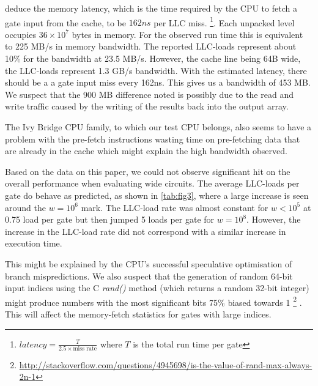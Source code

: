 deduce the memory latency, which is the time required by the CPU to fetch a gate
input from the cache, to be $162ns$ per LLC miss.
\footnote{ $latency = \frac{T}{2.5 \times \text{miss rate}}$ where $T$ is the total run time per gate}.
Each unpacked level occupies $ 36\times10^7$ bytes in memory. For the observed
run time this is equivalent to 225 MB/s in memory bandwidth. The reported LLC-loads
represent about 10\% for the bandwidth at 23.5 MB/s. However, the cache line
being 64B wide, the LLC-loads represent 1.3 GB/s bandwidth. With the estimated
latency, there should be a a gate input miss every 162ns. This gives us a bandwidth
of 453 MB. We suspect that the 900 MB difference noted is possibly due to the
read and write traffic caused by the writing of the results back into the output
array.
\par
The Ivy Bridge CPU family, to which our test CPU belongs, also seems to have a
problem with the pre-fetch instructions wasting time on pre-fetching data that
are already in the cache\cite{agner} which might explain the high bandwidth
observed.
\par
Based on the data on this paper, we could not observe significant hit on the
overall performance when evaluating wide circuits. The average LLC-loads per
gate do behave as predicted, as shown in \ref{tab:fig3}, where a large increase
is seen around the $w = 10^6$ mark. The LLC-load rate was almost constant for
$w < 10^5 $ at 0.75 load per gate but then jumped 5 loads per gate for $w = 10^8$.
However, the increase in the LLC-load rate did not correspond with a similar
increase in execution time.
\par
This might be explained by the CPU's successful speculative optimisation of branch
mispredictions. We also suspect that the generation of random 64-bit input indices
using the C \textit{rand()} method (which returns a random 32-bit integer) might
produce numbers with the most significant bits 75\% biased towards 1
\footnote{\url{http://stackoverflow.com/questions/4945698/is-the-value-of-rand-max-always-2n-1}}
. This will affect the memory-fetch statistics for gates with large indices.
